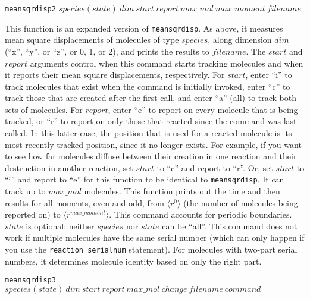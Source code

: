 \documentclass {scrbook}
\newcommand {\ttt} {\texttt}
\begin{document}
\begin{description}
\item{\ttt{meansqrdisp2} $species(state)\ dim\ start\ report\ max\_mol\ max\_moment\ filename$}

This function is an expanded version of \ttt{meansqrdisp}. As above, it measures mean square displacements of molecules of type $species$, along dimension $dim$ (``x'', ``y'', or ``z'', or 0, 1, or 2), and prints the results to $filename$. The $start$ and $report$ arguments control when this command starts tracking molecules and when it reports their mean square displacements, respectively. For $start$, enter ``i'' to track molecules that exist when the command is initially invoked, enter ``c'' to track those that are created after the first call, and enter ``a'' (all) to track both sets of molecules. For $report$, enter ``e'' to report on every molecule that is being tracked, or ``r'' to report on only those that reacted since the command was last called. In this latter case, the position that is used for a reacted molecule is its most recently tracked position, since it no longer exists. For example, if you want to see how far molecules diffuse between their creation in one reaction and their destruction in another reaction, set $start$ to ``c'' and report to ``r''. Or, set $start$ to ``i'' and report to ``e'' for this function to be identical to \ttt{meansqrdisp}. It can track up to $max\_mol$ molecules. This function prints out the time and then results for all moments, even and odd, from $\langle r^0 \rangle$ (the number of molecules being reported on) to $\langle r^{max\_moment} \rangle$. This command accounts for periodic boundaries. $state$ is optional; neither $species$ nor $state$ can be ``all''. This command does not work if multiple molecules have the same serial number (which can only happen if you use the \ttt{reaction\_serialnum} statement). For molecules with two-part serial numbers, it determines molecule identity based on only the right part.

\item{\ttt{meansqrdisp3} $species(state)\ dim\ start\ report\ max\_mol\ change\ filename\ command$}


\end{description}
\end{document}
